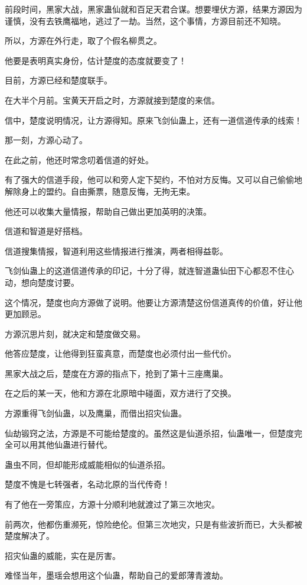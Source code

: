 \begin{this_body}
前段时间，黑家大战，黑家蛊仙就和百足天君合谋。想要埋伏方源，结果方源因为谨慎，没有去铁鹰福地，逃过了一劫。当然，这个事情，方源目前还不知晓。

所以，方源在外行走，取了个假名柳贯之。

他要是表明真实身份，估计楚度的态度就要变了！

目前，方源已经和楚度联手。

在大半个月前。宝黄天开启之时，方源就接到楚度的来信。

信中，楚度说明情况，让方源得知。原来飞剑仙蛊上，还有一道信道传承的线索！

那一刻，方源心动了。

在此之前，他还时常念叨着信道的好处。

有了强大的信道手段，他可以和旁人定下契约，不怕对方反悔。又可以自己偷偷地解除身上的盟约。自由撕票，随意反悔，无拘无束。

他还可以收集大量情报，帮助自己做出更加英明的决策。

信道和智道是好搭档。

信道搜集情报，智道利用这些情报进行推演，两者相得益彰。

飞剑仙蛊上的这道信道传承的印记，十分了得，就连智道蛊仙田下心都忍不住心动，想向楚度讨要。

这个情况，楚度也向方源做了说明。他要让方源清楚这份信道真传的价值，好让他更加顾忌。

方源沉思片刻，就决定和楚度做交易。

他答应楚度，让他得到狂蛮真意，而楚度也必须付出一些代价。

黑家大战之后，楚度在方源的指点下，抢到了第十三座鹰巢。

在之后的某一天，他和方源在北原暗中碰面，双方进行了交换。

方源重得飞剑仙蛊，以及鹰巢，而借出招灾仙蛊。

仙劫锻窍之法，方源是不可能给楚度的。虽然这是仙道杀招，仙蛊唯一，但楚度完全可以用其他仙蛊进行替代。

蛊虫不同，但却能形成威能相似的仙道杀招。

楚度不愧是七转强者，名动北原的当代传奇！

有了他在一旁策应，方源十分顺利地就渡过了第三次地灾。

前两次，他都伤重濒死，惊险绝伦。但第三次地灾，只是有些波折而已，大头都被楚度解决了。

招灾仙蛊的威能，实在是厉害。

难怪当年，墨瑶会想用这个仙蛊，帮助自己的爱郎薄青渡劫。


\end{this_body}
